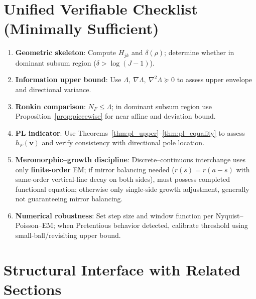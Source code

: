 \documentclass[11pt,a4paper]{article}
\theoremstyle{remark}
\begin{document}
\section{Unified Verifiable Checklist (Minimally Sufficient)}

\begin{enumerate}
\item \textbf{Geometric skeleton}: Compute $H_{jk}$ and $\delta(\rho)$; determine whether in dominant subsum region ($\delta>\log(J-1)$).

\item \textbf{Information upper bound}: Use $\Lambda,\ \nabla\Lambda,\ \nabla^2\Lambda\succeq0$ to assess upper envelope and directional variance.

\item \textbf{Ronkin comparison}: $N_F\le\Lambda$; in dominant subsum region use Proposition~\ref{prop:piecewise} for near affine and deviation bound.

\item \textbf{PL indicator}: Use Theorems~\ref{thm:pl_upper}--\ref{thm:pl_equality} to assess $h_F(\mathbf{v})$ and verify consistency with directional pole location.

\item \textbf{Meromorphic--growth discipline}: Discrete--continuous interchange uses only \textbf{finite-order} EM; if mirror balancing needed ($r(s)=r(a-s)$ with same-order vertical-line decay on both sides), must possess completed functional equation; otherwise only single-side growth adjustment, generally not guaranteeing mirror balancing.

\item \textbf{Numerical robustness}: Set step size and window function per Nyquist--Poisson--EM; when Pretentious behavior detected, calibrate threshold using small-ball/revisiting upper bound.
\end{enumerate}

\section{Structural Interface with Related Sections}
\end{document}
